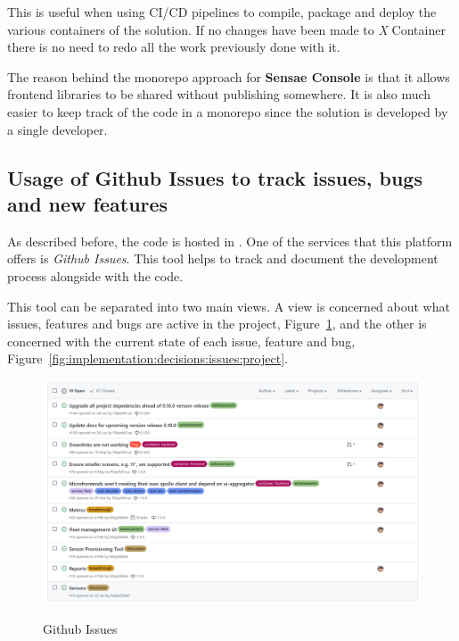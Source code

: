 This is useful when using CI/CD pipelines to compile, package and deploy the various containers of the solution. If no changes have been made to \textit{X} Container there is no need to redo all the work previously done with it.

The reason behind the monorepo approach for \textbf{Sensae Console} is that it allows frontend libraries to be shared without publishing somewhere. It is also much easier to keep track of the code in a monorepo since the solution is developed by a single developer.

\subsection{Usage of Github Issues to track issues, bugs and new features}
\label{subsec:implementation:decisions:issues}

As described before, the code is hosted in . One of the services that this platform offers is \textit{Github Issues}. This tool helps to track and document the development process alongside with the code.

This tool can be separated into two main views. A view is concerned about what issues, features and bugs are active in the project, Figure~\ref{fig:implementation:decisions:issues:board}, and the other is concerned with the current state of each issue, feature and bug, Figure~\ref{fig:implementation:decisions:issues:project}.

\begin{figure}[H]
    \centering
    \resizebox{\columnwidth}{!}
    {
       \includegraphics{assets/figures/github-2.png}
    }
    \caption[Github Issues]{Github Issues}
    \label{fig:implementation:decisions:issues:board}
\end{figure}

